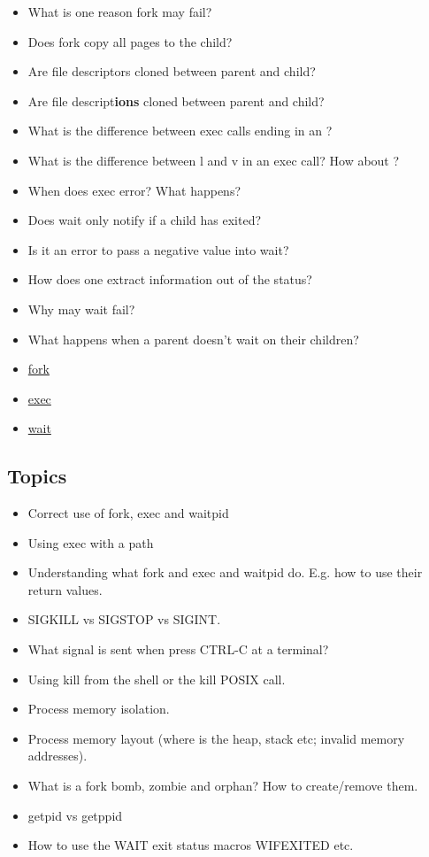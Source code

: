 \begin{itemize}
\item What is one reason fork may fail?
\item Does fork copy all pages to the child?
\item Are file descriptors cloned between parent and child?
\item Are file descript\textbf{ions} cloned between parent and child?
\item What is the difference between exec calls ending in an ?
\item What is the difference between l and v in an exec call? How about ?
\item When does exec error? What happens?
\item Does wait only notify if a child has exited?
\item Is it an error to pass a negative value into wait?
\item How does one extract information out of the status?
\item Why may wait fail?
\item What happens when a parent doesn't wait on their children?
\end{itemize}

\begin{itemize}
\item \href{http://man7.org/linux/man-pages/man2/fork.2.html}{fork}
\item \href{http://man7.org/linux/man-pages/man3/exec.3.html}{exec}
\item \href{http://man7.org/linux/man-pages/man2/wait.2.html}{wait}
\end{itemize}

\subsection{Topics}

\begin{itemize}
\item Correct use of fork, exec and waitpid
\item Using exec with a path
\item Understanding what fork and exec and waitpid do. E.g. how to use their return values.
\item SIGKILL vs SIGSTOP vs SIGINT.
\item What signal is sent when press CTRL-C at a terminal?
\item Using kill from the shell or the kill POSIX call.
\item Process memory isolation.
\item Process memory layout (where is the heap, stack etc; invalid memory addresses).
\item What is a fork bomb, zombie and orphan? How to create/remove them.
\item getpid vs getppid
\item How to use the WAIT exit status macros WIFEXITED etc.
\end{itemize}

